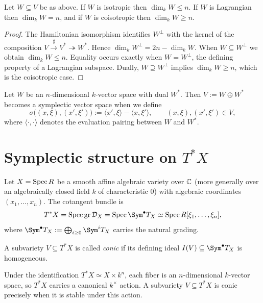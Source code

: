 \begin{lemma}[Lemma~7.2]
    Let $W\subseteq V$ be as above.  If $W$ is isotropic then $\dim_k W\le n$.
    If $W$ is Lagrangian then $\dim_k W=n$, and if $W$ is coisotropic then
    $\dim_k W\ge n$.
\end{lemma}
\begin{proof}
    The Hamiltonian isomorphism identifies $W^\perp$ with the kernel of the
    composition $V\xrightarrow{\sharp}V^\ast\twoheadrightarrow W^\ast$.  Hence
    $\dim_k W^\perp=2n-\dim_k W$.  When $W\subseteq W^\perp$ we obtain
    $\dim_k W\le n$.  Equality occurs exactly when $W=W^\perp$, the defining
    property of a Lagrangian subspace.  Dually, $W\supseteq W^\perp$ implies
    $\dim_k W\ge n$, which is the coisotropic case.
\end{proof}

\begin{example}[Ex.~7.2]\label{ex:symplectic-standard}
    Let $W$ be an $n$-dimensional $k$-vector space with dual $W^\ast$.  Then
    $V:=W\oplus W^\ast$ becomes a symplectic vector space when we define
    \[
        \sigma\big((x,\xi),(x',\xi')\big)
        :=\langle x',\xi\rangle-\langle x,\xi'\rangle,
        \qquad (x,\xi),(x',\xi')\in V,
    \]
    where $\langle\cdot,\cdot\rangle$ denotes the evaluation pairing between
    $W$ and $W^\ast$.
\end{example}

\section{Symplectic structure on $T^\ast X$}

Let $X=\operatorname{Spec} R$ be a smooth affine algebraic variety over $\mathbb{C}$ (more generally
over an algebraically closed field $k$ of characteristic $0$) with algebraic
coordinates $(x_1,\dots,x_n)$.  The cotangent bundle is
\[
    T^\ast X = \Spec \gr \D_X = \Spec \Sym^\bullet T_X
    \simeq \Spec R[\xi_1,\dots,\xi_n],
\]
where $\Sym^\bullet T_X:=\bigoplus_{i\ge0}\Sym^i T_X$ carries the natural
grading.

\begin{definition}[Def.~8.1]
    A subvariety $V\subseteq T^\ast X$ is called \emph{conic} if its defining ideal
    $I(V)\subseteq \Sym^\bullet T_X$ is homogeneous.
\end{definition}

\begin{remark}
    Under the identification $T^\ast X\simeq X\times k^n$, each fiber is an
    $n$-dimensional $k$-vector space, so $T^\ast X$ carries a canonical $k^\times$
    action.  A subvariety $V\subseteq T^\ast X$ is conic precisely when it is
    stable under this action.
\end{remark}

